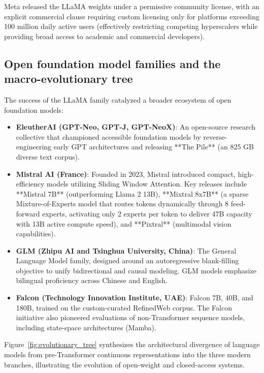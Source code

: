 \documentclass[../../../main.tex]{subfiles}
\begin{document}
Meta released the LLaMA weights under a permissive community license, with an explicit commercial clause requiring custom licensing only for platforms exceeding 100 million daily active users (effectively restricting competing hyperscalers while providing broad access to academic and commercial developers).


\subsection{Open foundation model families and the macro-evolutionary tree}
\label{subsec:open_model_families}

The success of the LLaMA family catalyzed a broader ecosystem of open foundation models:
\begin{itemize}
    \item \textbf{EleutherAI (GPT-Neo, GPT-J, GPT-NeoX)}: An open-source research collective that championed accessible foundation models by reverse-engineering early GPT architectures and releasing **The Pile** (an 825 GB diverse text corpus).
    
    \item \textbf{Mistral AI (France)}: Founded in 2023, Mistral introduced compact, high-efficiency models utilizing Sliding Window Attention. Key releases include **Mistral 7B** (outperforming Llama 2 13B), **Mixtral 8x7B** (a sparse Mixture-of-Experts model that routes tokens dynamically through 8 feed-forward experts, activating only 2 experts per token to deliver 47B capacity with 13B active compute speed), and **Pixtral** (multimodal vision capabilities).
    
    \item \textbf{GLM (Zhipu AI and Tsinghua University, China)}: The General Language Model family, designed around an autoregressive blank-filling objective to unify bidirectional and causal modeling. GLM models emphasize bilingual proficiency across Chinese and English.
    
    \item \textbf{Falcon (Technology Innovation Institute, UAE)}: Falcon 7B, 40B, and 180B, trained on the custom-curated RefinedWeb corpus. The Falcon initiative also pioneered evaluations of non-Transformer sequence models, including state-space architectures (Mamba).
\end{itemize}

Figure~\ref{fig:evolutionary_tree} synthesizes the architectural divergence of language models from pre-Transformer continuous representations into the three modern branches, illustrating the evolution of open-weight and closed-access systems.
\end{document}
